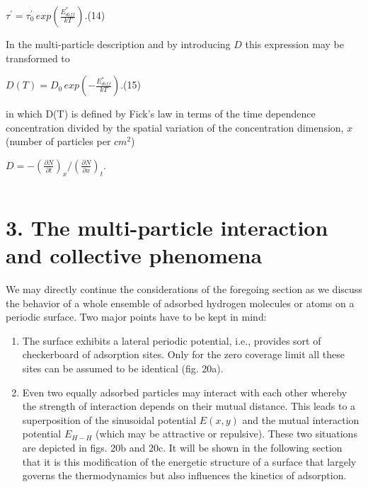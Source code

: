 \documentclass[11pt]{article}
\makeatletter
\newcommand{\boxspacing}{\kern\kvtcb@left@rule\kern\kvtcb@boxsep}
\newcommand{\prompt}[4]{
        {\ttfamily\llap{{\color{#2}[#3]:\hspace{3pt}#4}}\vspace{-\baselineskip}}
    }
\makeatother
\begin{document}
\(\tau^{\prime} = \tau^{\prime}_{0} \, exp \left(\frac{E^{*}_{diff}}{kT} \right)\).(14)

In the multi-particle description and by introducing \(D\) this
expression may be transformed to

\(D(T) = D_{0} \, exp \left(-\frac{E^{*}_{diff}}{kT} \right)\).(15)

in which D(T) is defined by Fick's law in terms of the time dependence
concentration divided by the spatial variation of the concentration
dimension, \(x\) (number of particles per \(cm^2\))

\(D = - \left(\frac{\partial N}{\partial t}\right)_x \Big/ \left(\frac{\partial N}{\partial x}\right)_t\).

    \begin{tcolorbox}[breakable, size=fbox, boxrule=1pt, pad at break*=1mm,colback=cellbackground, colframe=cellborder]
\prompt{In}{incolor}{ }{\boxspacing}
\begin{Verbatim}[commandchars=\\\{\}]

\end{Verbatim}
\end{tcolorbox}

    \section{3. The multi-particle interaction and collective
phenomena}\label{the-multi-particle-interaction-and-collective-phenomena}

    We may directly continue the considerations of the foregoing section as
we discuss the behavior of a whole ensemble of adsorbed hydrogen
molecules or atoms on a periodic surface. Two major points have to be
kept in mind:

\begin{enumerate}
\def\labelenumi{(\roman{enumi})}
\item
  The surface exhibits a lateral periodic potential, i.e., provides sort
  of checkerboard of adsorption sites. Only for the zero coverage limit
  all these sites can be assumed to be identical (fig. 20a).
\item
  Even two equally adsorbed particles may interact with each other
  whereby the strength of interaction depends on their mutual distance.
  This leads to a superposition of the sinusoidal potential \(E(x, y)\)
  and the mutual interaction potential \(E_{H-H}\) (which may be
  attractive or repulsive). These two situations are depicted in figs.
  20b and 20c. It will be shown in the following section that it is this
  modification of the energetic structure of a surface that largely
  governs the thermodynamics but also influences the kinetics of
  adsorption.
\end{enumerate}
\end{document}
